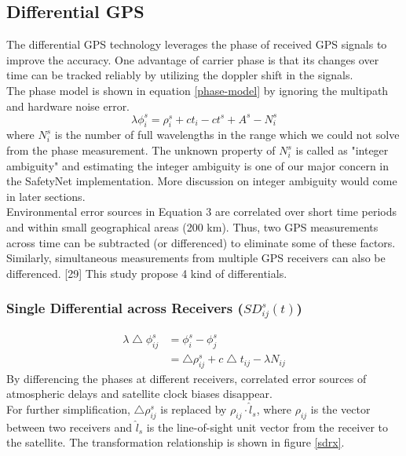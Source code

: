 \documentclass[journal,onecolumn]{IEEEtran}
\begin{document}
\subsection{Differential GPS}
The differential GPS technology leverages the phase of received GPS signals to improve
the accuracy. One advantage of carrier phase is that its changes over time can
be tracked reliably by utilizing the doppler shift in the signals.\\
The phase model is shown in equation \ref{phase-model} by ignoring the
multipath and hardware noise error.
\begin{equation}
  \lambda\phi_i^s = \rho_i^s + ct_i - ct^s + A^s - N_i^s
  \label{phase-model}
\end{equation}
where $N_i^s$ is the number of full wavelengths in the range which we could not
solve from the phase measurement. The unknown property of $N_i^s$ is called as
"integer ambiguity" and estimating the integer ambiguity is one of our major
concern in the SafetyNet implementation. More discussion on integer ambiguity
would come in later sections.\\
Environmental error sources in Equation 3 are correlated over short time periods
and within small geographical areas (200 km). Thus, two GPS measurements across
time can be subtracted (or differenced) to eliminate some of these factors.
Similarly, simultaneous measurements from multiple GPS receivers can also be
differenced. [29] This study propose 4 kind of differentials.
\subsubsection{Single Differential across Receivers ($SD_{ij}^s(t)$)}
\begin{equation}
  \begin{split}
    \lambda \bigtriangleup \phi_{ij}^s &= \phi_{i}^s - \phi_{j}^s\\
    &= \bigtriangleup \rho_{ij}^s + c\bigtriangleup t_{ij} - \lambda N_{ij}
  \end{split}
\end{equation}
By differencing the phases at different receivers, correlated error sources of
atmospheric delays and satellite clock biases disappear. \\
For further simplification, $\bigtriangleup \rho_{ij}^s$ is replaced by $\rho_{ij}\cdot \hat{l}_s$,
where $\rho_{ij}$ is the vector between two receivers and $\hat{l}_s$ is the
line-of-sight unit vector from the receiver to the satellite. The transformation
relationship is shown in figure \ref{sdrx}.
\end{document}
